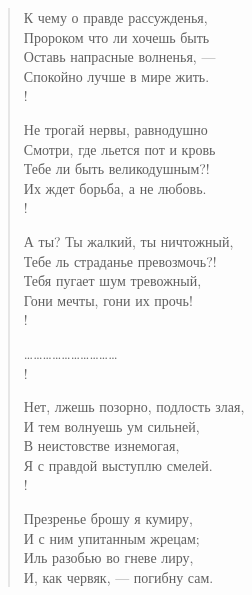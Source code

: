 \begin{verse}
\begin{altverse}
К чему о правде рассужденья,\\ 
    Пророком что ли хочешь быть\ldotse\\
Оставь напрасные волненья, ---\\
    Спокойно лучше в мире жить.\\!

Не трогай нервы, равнодушно\\
    Смотри, где льется пот и кровь\ldotst\\
Тебе ли быть великодушным?!\\
    Их ждет борьба, а не любовь.\\!

А ты? Ты жалкий, ты ничтожный,\\
    Тебе ль страданье превозмочь?!\\
Тебя пугает шум тревожный,\\
    Гони мечты, гони их прочь!\\!
\end{altverse}
\vin\ldots\ldots\ldots\ldots\ldots\ldots\ldots\ldots\ldots\ldots\\!
\begin{altverse}
Нет, лжешь позорно, подлость злая,\\
    И тем волнуешь ум сильней,\\
В неистовстве изнемогая,\\
    Я с правдой выступлю смелей.\\!

Презренье брошу я кумиру,\\
    И с ним упитанным жрецам;\\
Иль разобью во гневе лиру,\\
    И, как червяк, --- погибну сам.
\end{altverse}
\end{verse}

\newpage
\vspace*{0cm}


